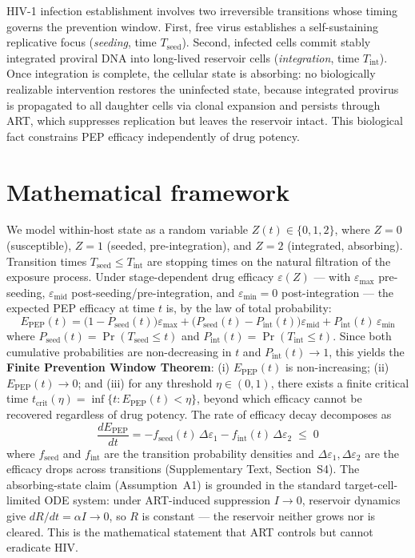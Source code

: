 \documentclass[10pt,letterpaper]{article}
\theoremstyle{definition}
\theoremstyle{remark}
\newcommand{\Tseed}{T_{\text{seed}}}
\newcommand{\Tint}{T_{\text{int}}}
\newcommand{\Pseed}{P_{\text{seed}}}
\newcommand{\Pint}{P_{\text{int}}}
\newcommand{\Epep}{E_{\text{PEP}}}
\newcommand{\tcrit}{t_{\text{crit}}}
\newcommand{\emax}{\varepsilon_{\max}}
\newcommand{\emid}{\varepsilon_{\text{mid}}}
\newcommand{\emin}{\varepsilon_{\min}}
\begin{document}
HIV-1 infection establishment involves two irreversible transitions whose timing governs the prevention window. First, free virus establishes a self-sustaining replicative focus (\emph{seeding}, time $\Tseed$). Second, infected cells commit stably integrated proviral DNA into long-lived reservoir cells (\emph{integration}, time $\Tint$). Once integration is complete, the cellular state is absorbing: no biologically realizable intervention restores the uninfected state, because integrated provirus is propagated to all daughter cells via clonal expansion\cite{chun1995,siliciano2005} and persists through ART, which suppresses replication but leaves the reservoir intact\cite{perelson1997}. This biological fact constrains PEP efficacy independently of drug potency.

\section*{Mathematical framework}

We model within-host state as a random variable $Z(t) \in \{0, 1, 2\}$, where $Z=0$ (susceptible), $Z=1$ (seeded, pre-integration), and $Z=2$ (integrated, absorbing). Transition times $\Tseed \leq \Tint$ are stopping times on the natural filtration of the exposure process. Under stage-dependent drug efficacy $\varepsilon(Z)$ --- with $\emax$ pre-seeding, $\emid$ post-seeding/pre-integration, and $\emin = 0$ post-integration --- the expected PEP efficacy at time $t$ is, by the law of total probability:
\begin{equation}
\Epep(t) = \big(1 - \Pseed(t)\big)\emax + \big(\Pseed(t) - \Pint(t)\big)\emid + \Pint(t)\,\emin
\label{eq:master}
\end{equation}
where $\Pseed(t) = \Pr(\Tseed \leq t)$ and $\Pint(t) = \Pr(\Tint \leq t)$. Since both cumulative probabilities are non-decreasing in $t$ and $\Pint(t) \to 1$, this yields the \textbf{Finite Prevention Window Theorem}: (i) $\Epep(t)$ is non-increasing; (ii) $\Epep(t) \to 0$; and (iii) for any threshold $\eta \in (0,1)$, there exists a finite critical time $\tcrit(\eta) = \inf\{t : \Epep(t) < \eta\}$, beyond which efficacy cannot be recovered regardless of drug potency. The rate of efficacy decay decomposes as
\begin{equation}
\frac{d\Epep}{dt} = -f_{\text{seed}}(t)\,\Delta\varepsilon_{1} - f_{\text{int}}(t)\,\Delta\varepsilon_{2} \;\leq\; 0
\label{eq:hazard}
\end{equation}
where $f_{\text{seed}}$ and $f_{\text{int}}$ are the transition probability densities and $\Delta\varepsilon_{1}, \Delta\varepsilon_{2}$ are the efficacy drops across transitions (Supplementary Text, Section~S4). The absorbing-state claim (Assumption~A1) is grounded in the standard target-cell-limited ODE system\cite{perelson1996}: under ART-induced suppression $I \to 0$, reservoir dynamics give $dR/dt = \alpha I \to 0$, so $R$ is constant --- the reservoir neither grows nor is cleared. This is the mathematical statement that ART controls but cannot eradicate HIV.
\end{document}
